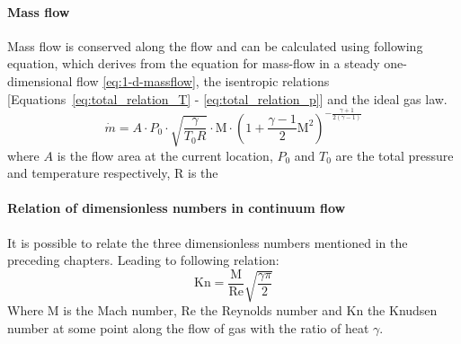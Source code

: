 	\paragraph{Mass flow}
		Mass flow is conserved along the flow and can be calculated using following equation, which derives from the equation for mass-flow in a steady one-dimensional flow \eqref{eq:1-d-massflow}, the isentropic relations [Equations~\eqref{eq:total_relation_T} - \eqref{eq:total_relation_p}] and the ideal gas law.
		\cite{benson_mass_nodate}
		\begin{equation}
			\dot{m} = A \cdot P_0 \cdot \sqrt{\frac{\gamma}{T_0 R}} \cdot \mathrm{M}\cdot \left(1 + \frac{\gamma - 1}{2} \mathrm{M}^2\right)^{-\frac{\gamma + 1}{2(\gamma - 1)}}
			\label{eq:1-d-massflow}
		\end{equation}
		where $A$ is the flow area at the current location, $P_0$ and $T_0$ are the total pressure and temperature respectively, R is the    
	\paragraph{Relation of dimensionless numbers in continuum flow}
		It is possible to relate the three dimensionless numbers mentioned in the preceding chapters.
		Leading to following relation:
		\begin{equation}
			\mathrm{Kn} = \frac{\mathrm{M}}{\mathrm{Re}} \sqrt{\frac{\gamma \pi}{2}}
			\label{eq:nondim-relation}
		\end{equation}
		Where $\mathrm{M}$ is the Mach number, $\mathrm{Re}$ the Reynolds number and $\mathrm{Kn}$ the Knudsen number at some point along the flow of gas with the ratio of heat $\gamma$.
		\cite{Cengel2017, LiLam1964, EMMONS1958}
